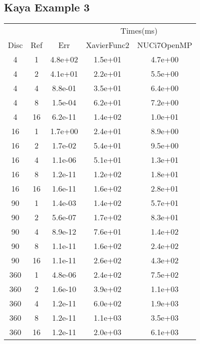 \subsection{Kaya Example 3}
\begin{center}
  \begin{tabular}{c|c|c|c|c}
      &&&\multicolumn{2}{|c}{Times(ms)}\\
    Disc&Ref&Err&XavierFunc2&NUCi7OpenMP\\
    \hline
    4&1&4.8e+02&1.5e+01&4.7e+00\\
    4&2&4.1e+01&2.2e+01&5.5e+00\\
    4&4&8.8e-01&3.5e+01&6.4e+00\\
    4&8&1.5e-04&6.2e+01&7.2e+00\\
    4&16&6.2e-11&1.4e+02&1.0e+01\\
    \hline
    16&1&1.7e+00&2.4e+01&8.9e+00\\
    16&2&1.7e-02&5.4e+01&9.5e+00\\
    16&4&1.1e-06&5.1e+01&1.3e+01\\
    16&8&1.2e-11&1.2e+02&1.8e+01\\
    16&16&1.6e-11&1.6e+02&2.8e+01\\
    \hline
    90&1&1.4e-03&1.4e+02&5.7e+01\\
    90&2&5.6e-07&1.7e+02&8.3e+01\\
    90&4&8.9e-12&7.6e+01&1.4e+02\\
    90&8&1.1e-11&1.6e+02&2.4e+02\\
    90&16&1.1e-11&2.6e+02&4.3e+02\\
    \hline
    360&1&4.8e-06&2.4e+02&7.5e+02\\
    360&2&1.6e-10&3.9e+02&1.1e+03\\
    360&4&1.2e-11&6.0e+02&1.9e+03\\
    360&8&1.2e-11&1.1e+03&3.5e+03\\
    360&16&1.2e-11&2.0e+03&6.1e+03\\
    \hline
  \end{tabular}
\end{center}







